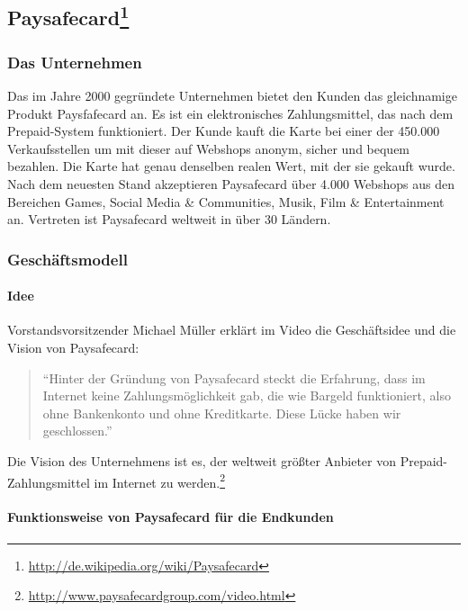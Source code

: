 \subsection[Paysafecard]{Paysafecard\footnote{\url{http://de.wikipedia.org/wiki/Paysafecard}}}
\subsubsection{Das Unternehmen}
Das im Jahre 2000 gegründete Unternehmen bietet den Kunden das gleichnamige Produkt Paysfafecard an. Es ist ein elektronisches Zahlungsmittel, das nach dem Prepaid-System funktioniert. Der Kunde kauft die Karte bei einer der 450.000 Verkaufsstellen um mit dieser auf Webshops anonym, sicher und bequem bezahlen. Die Karte hat genau denselben realen Wert, mit der sie gekauft wurde. Nach dem neuesten Stand akzeptieren Paysafecard über 4.000 Webshops aus den Bereichen Games, Social Media \& Communities, Musik, Film \& Entertainment an. Vertreten ist Paysafecard weltweit in über 30 Ländern.



\subsubsection{Geschäftsmodell}

\paragraph{Idee}\label{idee}

Vorstandsvorsitzender Michael Müller erklärt im Video die Geschäfts\-idee und die Vision von Paysafecard:
\begin{quote}
``Hinter der Gründung von Paysafecard steckt die Erfahrung, dass im Internet keine Zahlungsmöglichkeit gab, die wie Bargeld funktioniert, also ohne Bankenkonto und ohne Kreditkarte. Diese Lücke haben wir geschlossen.''
\end{quote}
Die Vision des Unternehmens ist es, der weltweit größter Anbieter von Pre\-paid-Zahlungsmittel im Internet zu werden.\footnote{\url{ http://www.paysafecardgroup.com/video.html}}


\paragraph{Funktionsweise von Paysafecard für die Endkunden}

